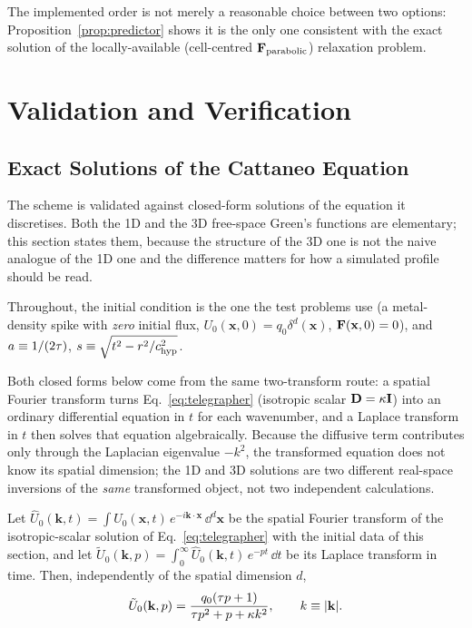 The implemented order is not merely a reasonable choice between two
options: Proposition~\ref{prop:predictor} shows it is the only one
consistent with the exact solution of the locally-available (cell-centred
$\mathbf{F}_{\rm parabolic}$) relaxation problem.

\section{Validation and Verification}

\subsection{Exact Solutions of the Cattaneo Equation}
\label{sec:exact-solutions}

The scheme is validated against closed-form solutions of the equation it
discretises. Both the 1D and the 3D free-space Green's functions are
elementary; this section states them, because the structure of the 3D one
is not the naive analogue of the 1D one and the difference matters for how
a simulated profile should be read.

Throughout, the initial condition is the one the test problems use (a
metal-density spike with \emph{zero} initial flux,
$U_0(\mathbf x,0)=q_0\delta^d(\mathbf x)$, $\mathbf{F}(\mathbf x,0)=0$), and
$a\equiv1/(2\tau)$, $s\equiv\sqrt{t^2-r^2/c_{\rm hyp}^2}$.

Both closed forms below come from the same two-transform route: a spatial
Fourier transform turns Eq.~\eqref{eq:telegrapher} (isotropic scalar
$\mathbf{D}=\kappa\mathbf I$) into an ordinary differential equation in $t$ for
each wavenumber, and a Laplace transform in $t$ then solves that equation
algebraically. Because the diffusive term contributes only through the
Laplacian eigenvalue $-k^2$, the transformed equation does not know its
spatial dimension; the 1D and 3D solutions are two different real-space
inversions of the \emph{same} transformed object, not two independent
calculations.

\begin{proposition}
\label{prop:transform-solution}
Let $\hat U_0(\mathbf k,t)=\int U_0(\mathbf x,t)\,e^{-i\mathbf k\cdot\mathbf
x}\,\dd^d\mathbf x$ be the spatial Fourier transform of the
isotropic-scalar solution of Eq.~\eqref{eq:telegrapher} with the initial
data of this section, and let
$\tilde U_0(\mathbf k,p)=\int_0^\infty\hat U_0(\mathbf k,t)\,e^{-pt}\,\dd t$
be its Laplace transform in time. Then, independently of the spatial
dimension $d$,
\begin{equation}
  \label{eq:transform-solution}
  \tilde U_0(\mathbf k,p) = \frac{q_0(\tau p+1)}{\tau p^2+p+\kappa k^2} ,
  \qquad k\equiv|\mathbf k| .
\end{equation}
\end{proposition}

